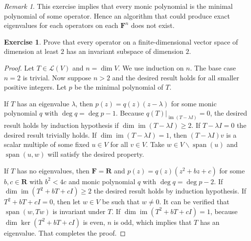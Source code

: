 \documentclass[nofonts,colorlinks]{tufte-handout}
\theoremstyle{plain} %
\theoremstyle{definition}
\newtheorem{exer}[thm]{Exercise}
\theoremstyle{remark}
\newtheorem{rmk}[thm]{Remark}
\newcommand{\rest}[2]{\mathopen{}\left.#1\right|_{#2}}
\newcommand{\R}{\mathbf{R}}
\newcommand{\F}{\mathbf{F}}
\renewcommand{\L}{\mathcal{L}}
\DeclareMathOperator{\spn}{span}
\DeclareMathOperator{\im}{im}
\begin{document}
\begin{rmk}
	This exercise implies that every monic polynomial is the minimal polynomial of some operator. Hence an algorithm that could produce exact eigenvalues for each operators on each $\F^n$ does not exist.
\end{rmk}

\begin{exer}
	Prove that every operator on a finite-dimensional vector space of dimension at least $2$ has an invariant subspace of dimension $2$.
\end{exer}
\begin{proof}
	Let $T\in\L(V)$ and $n=\dim V$. We use induction on $n$. The base case $n=2$ is trivial. Now suppose $n>2$ and the desired result holds for all smaller positive integers. Let $p$ be the minimal polynomial of $T$.

	If $T$ has an eigenvalue $\lambda$, then $p(z)=q(z)(z-\lambda)$ for some monic polynomial $q$ with $\deg q=\deg p-1$. Because $\rest{q(T)}{\im(T-\lambda I)}=0$, the desired result holds by induction hypothesis if $\dim\im(T-\lambda I)\geq2$. If $T-\lambda I=0$ the desired result trivially holds. If $\dim\im(T-\lambda I)=1$, then $(T-\lambda I)v$ is a scalar multiple of some fixed $u\in V$ for all $v\in V$. Take $w\in V\backslash\spn(u)$ and $\spn(u,w)$ will satisfy the desired property.

	If $T$ has no eigenvalues, then $\F=\R$ and $p(z)=q(z)(z^2+bz+c)$ for some $b,c\in\R$ with $b^2<4c$ and monic polynomial $q$ with $\deg q=\deg p-2$. If $\dim\im(T^2+bT+cI)\geq2$ the desired result holds by induction hypothesis. If $T^2+bT+cI=0$, then let $w\in V$ be such that $w\neq0$. It can be verified that $\spn(w,Tw)$ is invariant under $T$. If $\dim\im(T^2+bT+cI)=1$, because $\dim\ker(T^2+bT+cI)$ is even, $n$ is odd, which implies that $T$ has an eigenvalue. That completes the proof.
\end{proof}
\end{document}
